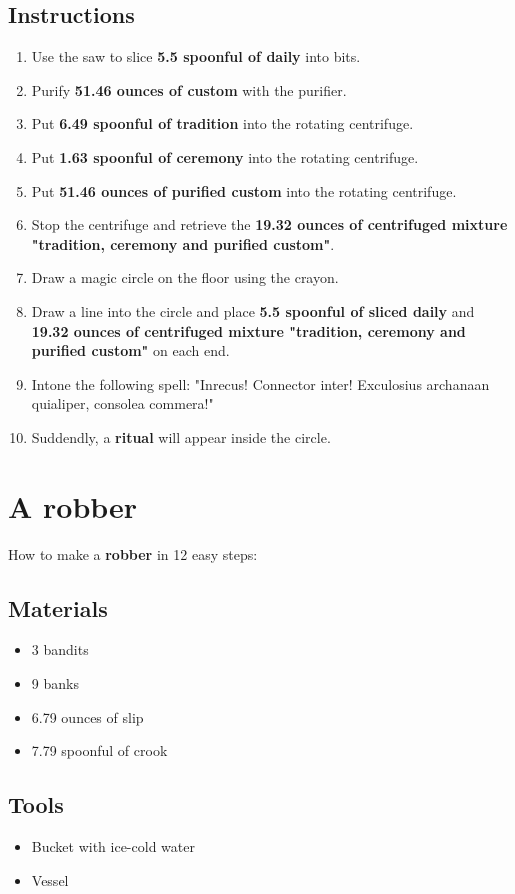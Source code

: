 \documentclass{article}
\begin{document}
\subsection{Instructions}\begin{enumerate}
\item 
Use the saw to slice \textbf{5.5 spoonful of daily} into bits.
\item 
Purify \textbf{51.46 ounces of custom} with the purifier.
\item 
Put \textbf{6.49 spoonful of tradition} into the rotating centrifuge.
\item 
Put \textbf{1.63 spoonful of ceremony} into the rotating centrifuge.
\item 
Put \textbf{51.46 ounces of purified custom} into the rotating centrifuge.
\item 
Stop the centrifuge and retrieve the \textbf{19.32 ounces of centrifuged mixture "tradition, ceremony and purified custom"}.
\item 
Draw a magic circle on the floor using the crayon.
\item 
Draw a line into the circle and place \textbf{5.5 spoonful of sliced daily} and \textbf{19.32 ounces of centrifuged mixture "tradition, ceremony and purified custom"} on each end.
\item 
Intone the following spell: "Inrecus! Connector inter! Exculosius archanaan quialiper, consolea commera!"
\item 
Suddendly, a \textbf{ritual} will appear inside the circle.
\end{enumerate}
\newpage
\section{A robber}How to make a \textbf{robber} in 12 easy steps:

\subsection{Materials}\begin{itemize}
\item 
3 bandits
\item 
9 banks
\item 
6.79 ounces of slip
\item 
7.79 spoonful of crook
\end{itemize}
\subsection{Tools}\begin{itemize}
\item 
Bucket with ice-cold water
\item 
Vessel
\end{itemize}
\end{document}
